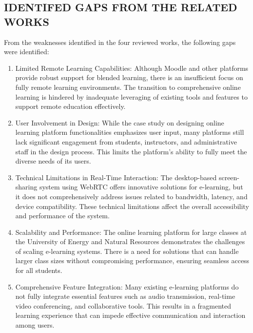 \documentclass[a4paper,12pt]{article}  %
\begin{document}
\subsection{IDENTIFED GAPS FROM THE RELATED WORKS}
From the weaknesses identified in the four reviewed works, the following gaps
were identified:\\

\begin{enumerate}
  \item Limited Remote Learning Capabilities: Although Moodle and other platforms
        provide robust support for blended learning, there is an insufficient focus on
        fully remote learning environments. The transition to comprehensive online
        learning is hindered by inadequate leveraging of existing tools and features to
        support remote education effectively.\\

  \item User Involvement in Design: While the case study on designing online learning
        platform functionalities emphasizes user input, many platforms still lack
        significant engagement from students, instructors, and administrative staff in
        the design process. This limits the platform's ability to fully meet the
        diverse needs of its users.\\

  \item Technical Limitations in Real-Time Interaction: The desktop-based
        screen-sharing system using WebRTC offers innovative solutions for e-learning,
        but it does not comprehensively address issues related to bandwidth, latency,
        and device compatibility. These technical limitations affect the overall
        accessibility and performance of the system.\\

  \item Scalability and Performance: The online learning platform for large classes at
        the University of Energy and Natural Resources demonstrates the challenges of
        scaling e-learning systems. There is a need for solutions that can handle
        larger class sizes without compromising performance, ensuring seamless access
        for all students.\\

  \item Comprehensive Feature Integration: Many existing e-learning platforms do not
        fully integrate essential features such as audio transmission, real-time video
        conferencing, and collaborative tools. This results in a fragmented learning
        experience that can impede effective communication and interaction among
        users.\\
\end{enumerate}
\end{document}
